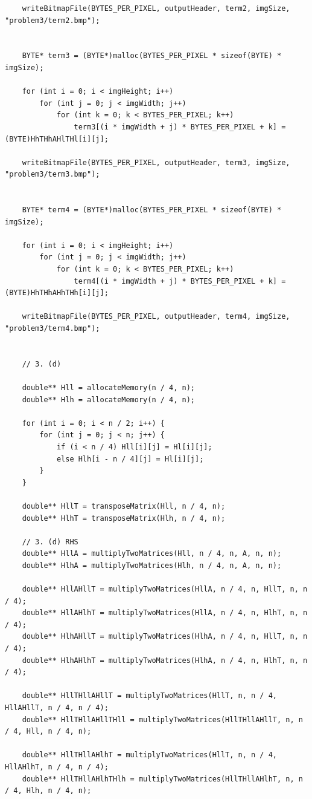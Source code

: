 \begin{verbatim}
    writeBitmapFile(BYTES_PER_PIXEL, outputHeader, term2, imgSize, "problem3/term2.bmp");


    BYTE* term3 = (BYTE*)malloc(BYTES_PER_PIXEL * sizeof(BYTE) * imgSize);

    for (int i = 0; i < imgHeight; i++)
        for (int j = 0; j < imgWidth; j++)
            for (int k = 0; k < BYTES_PER_PIXEL; k++)
                term3[(i * imgWidth + j) * BYTES_PER_PIXEL + k] = (BYTE)HhTHhAHlTHl[i][j];

    writeBitmapFile(BYTES_PER_PIXEL, outputHeader, term3, imgSize, "problem3/term3.bmp");


    BYTE* term4 = (BYTE*)malloc(BYTES_PER_PIXEL * sizeof(BYTE) * imgSize);

    for (int i = 0; i < imgHeight; i++)
        for (int j = 0; j < imgWidth; j++)
            for (int k = 0; k < BYTES_PER_PIXEL; k++)
                term4[(i * imgWidth + j) * BYTES_PER_PIXEL + k] = (BYTE)HhTHhAHhTHh[i][j];

    writeBitmapFile(BYTES_PER_PIXEL, outputHeader, term4, imgSize, "problem3/term4.bmp");

    
    // 3. (d)

    double** Hll = allocateMemory(n / 4, n);
    double** Hlh = allocateMemory(n / 4, n);

    for (int i = 0; i < n / 2; i++) {
        for (int j = 0; j < n; j++) {
            if (i < n / 4) Hll[i][j] = Hl[i][j];
            else Hlh[i - n / 4][j] = Hl[i][j];
        }
    }

    double** HllT = transposeMatrix(Hll, n / 4, n);
    double** HlhT = transposeMatrix(Hlh, n / 4, n);

    // 3. (d) RHS
    double** HllA = multiplyTwoMatrices(Hll, n / 4, n, A, n, n);
    double** HlhA = multiplyTwoMatrices(Hlh, n / 4, n, A, n, n);

    double** HllAHllT = multiplyTwoMatrices(HllA, n / 4, n, HllT, n, n / 4);
    double** HllAHlhT = multiplyTwoMatrices(HllA, n / 4, n, HlhT, n, n / 4);
    double** HlhAHllT = multiplyTwoMatrices(HlhA, n / 4, n, HllT, n, n / 4);
    double** HlhAHlhT = multiplyTwoMatrices(HlhA, n / 4, n, HlhT, n, n / 4);
    
    double** HllTHllAHllT = multiplyTwoMatrices(HllT, n, n / 4, HllAHllT, n / 4, n / 4);
    double** HllTHllAHllTHll = multiplyTwoMatrices(HllTHllAHllT, n, n / 4, Hll, n / 4, n);

    double** HllTHllAHlhT = multiplyTwoMatrices(HllT, n, n / 4, HllAHlhT, n / 4, n / 4);
    double** HllTHllAHlhTHlh = multiplyTwoMatrices(HllTHllAHlhT, n, n / 4, Hlh, n / 4, n);


\end{verbatim}
